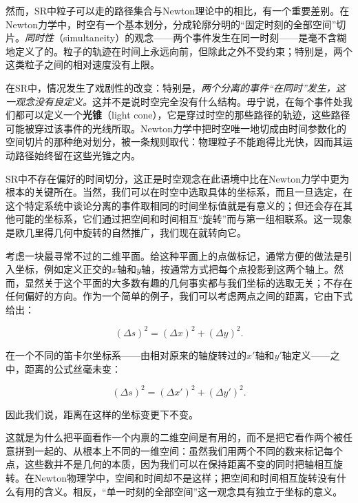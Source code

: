 然而，SR中粒子可以走的路径集合与Newton理论中的相比，有一个重要差别。在Newton力学中，时空有一个基本划分，分成轮廓分明的“固定时刻的全部空间”切片。\emph{同时性}（simultaneity）的观念——两个事件发生在同一时刻——是毫不含糊地定义了的。粒子的轨迹在时间上永远向前，但除此之外不受约束；特别是，两个这类粒子之间的相对速度没有上限。

在SR中，情况发生了戏剧性的改变：特别是，\emph{两个分离的事件“在同时”发生，这一观念没有良定义。}这并不是说时空完全没有什么结构。毋宁说，在每个事件处我们都可以定义一个\textbf{光锥}（light cone），它是穿过时空的那些路径的轨迹，这些路径可能被穿过该事件的光线所取。Newton力学中把时空唯一地切成由时间参数化的空间切片的那种绝对划分，被一条规则取代：物理粒子不能跑得比光快，因而其运动路径始终留在这些光锥之内。


SR中不存在偏好的时间切分，这正是时空观念在此语境中比在Newton力学中更为根本的关键所在。当然，我们可以在时空中选取具体的坐标系，而且一旦选定，在这个特定系统中谈论分离的事件取相同的时间坐标值就是有意义的；但还会存在其他可能的坐标系，它们通过把空间和时间相互“旋转”而与第一组相联系。这一现象是欧几里得几何中旋转的自然推广，我们现在就转向它。

考虑一块最寻常不过的二维平面。给这种平面上的点做标记，通常方便的做法是引入坐标，例如定义正交的$x$轴和$y$轴，按通常方式把每个点投影到这两个轴上。然而，显然关于这个平面的大多数有趣的几何事实都与我们坐标的选取无关；不存在任何偏好的方向。作为一个简单的例子，我们可以考虑两点之间的距离，它由下式给出：

\begin{equation*}
(\Delta s)^2 = (\Delta x)^2 + (\Delta y)^2.
\tag{1.7}
\end{equation*}

在一个不同的笛卡尔坐标系——由相对原来的轴旋转过的$x'$轴和$y'$轴定义——之中，距离的公式丝毫未变：

\begin{equation*}
(\Delta s)^2 = (\Delta x')^2 + (\Delta y')^2.
\tag{1.8}
\end{equation*}

因此我们说，距离在这样的坐标变更下不变。


这就是为什么把平面看作一个内禀的二维空间是有用的，而不是把它看作两个被任意拼到一起的、从根本上不同的一维空间：虽然我们用两个不同的数来标记每个点，这些数并不是几何的本质，因为我们可以在保持距离不变的同时把轴相互旋转。在Newton物理学中，空间和时间却不是这样；把空间和时间相互旋转没有什么有用的含义。相反，“单一时刻的全部空间”这一观念具有独立于坐标的意义。

